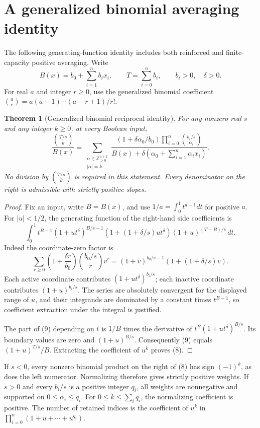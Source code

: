 \documentclass[11pt]{article}
\newtheorem{theorem}{Theorem}
\begin{document}
\section{A generalized binomial averaging identity}

The following generating-function identity includes both reinforced
and finite-capacity positive averaging. Write
\[
 B(x)=b_0+\sum_{i=1}^n b_i x_i,\qquad
 T=\sum_{i=0}^n b_i,
 \qquad b_i>0,\quad\delta>0.
 \tag{7}
\]
For real $a$ and integer $r\ge0$, use the generalized binomial
coefficient $\binom ar=a(a-1)\cdots(a-r+1)/r!$.

\begin{theorem}[Generalized binomial reciprocal identity]
For any nonzero real $s$ and any integer $k\ge0$, at every Boolean
input,
\[
 \frac{\binom{T/s}{k}}{B(x)}
 =\sum_{\substack{\alpha\in\mathbb Z_{\ge0}^{n+1}\\|\alpha|=k}}
 \frac{\left(1+\delta\alpha_0/b_0\right)
                  \prod_{i=0}^n\binom{b_i/s}{\alpha_i}}
      {B(x)+\delta\left(\alpha_0+\sum_{i=1}^n\alpha_i x_i\right)}.
 \tag{8}
\]
No division by $\binom{T/s}{k}$ is required in this statement.
Every denominator on the right is admissible with strictly positive
slopes.
\end{theorem}
\begin{proof}
Fix an input, write $B=B(x)$, and use $1/a=\int_0^1t^{a-1}dt$
for positive $a$. For $|u|<1/2$, the generating function of the
right-hand side coefficients is
\[
 \int_0^1 t^{B-1}(1+u t^\delta)^{B/s-1}
       \left(1+(1+\delta/s)u t^\delta\right)
                       (1+u)^{(T-B)/s}\,dt.
 \tag{9}
\]
Indeed the coordinate-zero factor is
\[
 \sum_{r\ge0}\left(1+\frac{\delta r}{b_0}\right)
                  \binom{b_0/s}{r}v^r
   =(1+v)^{b_0/s-1}\left(1+(1+\delta/s)v\right).
\]
Each active coordinate contributes $(1+u t^\delta)^{b_i/s}$;
each inactive coordinate contributes $(1+u)^{b_i/s}$.
The series are absolutely convergent for the displayed range of $u$,
and their integrands are dominated by a constant times $t^{B-1}$,
so coefficient extraction under the integral is justified.

The part of (9) depending on $t$ is $1/B$ times the derivative of
$t^B(1+u t^\delta)^{B/s}$. Its boundary values are zero and
$(1+u)^{B/s}$. Consequently (9) equals $(1+u)^{T/s}/B$.
Extracting the coefficient of $u^k$ proves (8).
\end{proof}

If $s<0$, every nonzero binomial product on the right of (8) has
sign $(-1)^k$, as does the left numerator. Normalizing therefore
gives strictly positive weights. If $s>0$ and every $b_i/s$ is a
positive integer $q_i$, all weights are nonnegative and supported
on $0\le\alpha_i\le q_i$. For $0\le k\le\sum_i q_i$, the
normalizing coefficient is positive. The number of retained
indices is the coefficient of $u^k$ in
$\prod_{i=0}^n(1+u+\cdots+u^{q_i})$.
\end{document}
